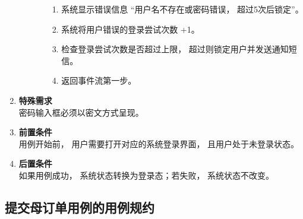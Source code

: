 \begin{enumerate}
\begin{enumerate}
\begin{enumerate}
            \begin{enumerate}
                \item 系统显示错误信息 “用户名不存在或密码错误， 超过5次后锁定”。
                \item 系统将用户错误的登录尝试次数 +1。
                \item 检查登录尝试次数是否超过上限， 超过则锁定用户并发送通知短信。
                \item 返回事件流第一步。
            \end{enumerate}
        \end{enumerate}
    \end{enumerate}
    \item \textbf{特殊需求} \\ 密码输入框必须以密文方式呈现。
    \item \textbf{前置条件} \\ 用例开始前， 用户需要打开对应的系统登录界面， 且用户处于未登录状态。
    \item \textbf{后置条件} \\ 如果用例成功， 系统状态转换为登录态；若失败， 系统状态不改变。
\end{enumerate}


\subsection{提交母订单用例的用例规约}



